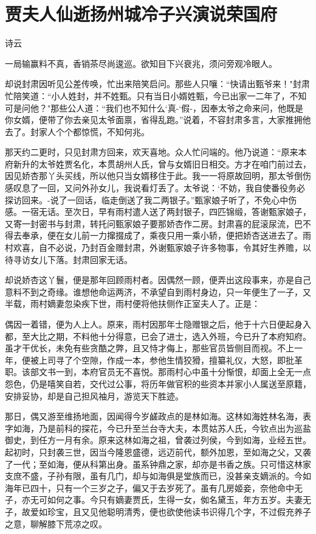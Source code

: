 \chapter{贾夫人仙逝扬州城\ttlbreak 冷子兴演说荣国府}

诗云

一局输赢料不真，香销茶尽尚逡巡。欲知目下兴衰兆，须问旁观冷眼人。

却说封肃因听见公差传唤，忙出来陪笑启问。那些人只嚷：“快请出甄爷来！"封肃忙陪笑道：“小人姓封，并不姓甄。只有当日小婿姓甄，今已出家一二年了，不知可是问他？"那些公人道：“我们也不知什么`真-`假-，因奉太爷之命来问，他既是你女婿，便带了你去亲见太爷面禀，省得乱跑。”说着，不容封肃多言，大家推拥他去了。封家人个个都惊慌，不知何兆。

那天约二更时，只见封肃方回来，欢天喜地。众人忙问端的。他乃说道：“原来本府新升的太爷姓贾名化，本贯胡州人氏，曾与女婿旧日相交。方才在咱门前过去，因见娇杏那丫头买线，所以他只当女婿移住于此。我一一将原故回明，那太爷倒伤感叹息了一回，又问外孙女儿，我说看灯丢了。太爷说：`不妨，我自使番役务必探访回来。-说了一回话，临走倒送了我二两银子。”甄家娘子听了，不免心中伤感。一宿无话。至次日，早有雨村遣人送了两封银子，四匹锦缎，答谢甄家娘子，又寄一封密书与封肃，转托问甄家娘子要那娇杏作二房。封肃喜的屁滚尿流，巴不得去奉承，便在女儿前一力撺掇成了，乘夜只用一乘小轿，便把娇杏送进去了。雨村欢喜，自不必说，乃封百金赠封肃，外谢甄家娘子许多物事，令其好生养赡，以待寻访女儿下落。封肃回家无话。

却说娇杏这丫鬟，便是那年回顾雨村者。因偶然一顾，便弄出这段事来，亦是自己意料不到之奇缘。谁想他命运两济，不承望自到雨村身边，只一年便生了一子，又半载，雨村嫡妻忽染疾下世，雨村便将他扶侧作正室夫人了。正是：

偶因一着错，便为人上人。原来，雨村因那年士隐赠银之后，他于十六日便起身入都，至大比之期，不料他十分得意，已会了进士，选入外班，今已升了本府知府。虽才干优长，未免有些贪酷之弊，且又恃才侮上，那些官员皆侧目而视。不上一年，便被上司寻了个空隙，作成一本，参他生情狡猾，擅纂礼仪，大怒，即批革职。该部文书一到，本府官员无不喜悦。那雨村心中虽十分惭恨，却面上全无一点怨色，仍是嘻笑自若，交代过公事，将历年做官积的些资本并家小人属送至原籍，安排妥协，却是自己担风袖月，游览天下胜迹。

那日，偶又游至维扬地面，因闻得今岁鹾政点的是林如海。这林如海姓林名海，表字如海，乃是前科的探花，今已升至兰台寺大夫，本贯姑苏人氏，今钦点出为巡盐御史，到任方一月有余。原来这林如海之祖，曾袭过列侯，今到如海，业经五世。起初时，只封袭三世，因当今隆恩盛德，远迈前代，额外加恩，至如海之父，又袭了一代；至如海，便从科第出身。虽系钟鼎之家，却亦是书香之族。只可惜这林家支庶不盛，子孙有限，虽有几门，却与如海俱是堂族而已，没甚亲支嫡派的。今如海年已四十，只有一个三岁之子，偏又于去岁死了。虽有几房姬妾，奈他命中无子，亦无可如何之事。今只有嫡妻贾氏，生得一女，侞名黛玉，年方五岁。夫妻无子，故爱如珍宝，且又见他聪明清秀，便也欲使他读书识得几个字，不过假充养子之意，聊解膝下荒凉之叹。

